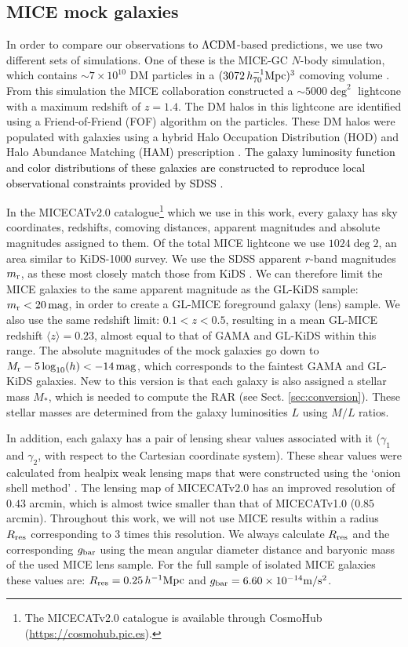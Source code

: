 \documentclass[usenatbib]{mnras}
\newcommand{\hMpc}{\, h^{-1}{\rm{Mpc}} }
\newcommand{\magn}{\, {\rm mag} }
\newcommand{\mpss}{ {\rm m/s^2} }
\newcommand{\hsMpc}{\, h_{70}^{-1}{\rm{Mpc}} }
\newcommand{\lcdm}{{\rm \Lambda CDM}}
\newcommand*{\meanb}[1]{\langle{#1}\rangle}
\newcommand*{\E}[1]{\times 10^{#1}}
\newcommand{\un}[1]{_{\rm #1}}
\begin{document}
\subsection{MICE mock galaxies}
\label{sec:mice_mocks}

In order to compare our observations to $\lcdm$-based predictions, we use two different sets of simulations. One of these is the MICE-GC $N$-body simulation, which contains $\sim 7\E{10}$ DM particles in a $(3072 \hsMpc)^3$ comoving volume \cite[]{fosalba2015b}. From this simulation the MICE collaboration constructed a $\sim5000\deg^2$ lightcone with a maximum redshift of $z=1.4$. The DM halos in this lightcone are identified using a Friend-of-Friend (FOF) algorithm on the particles. These DM halos were populated with galaxies using a hybrid Halo Occupation Distribution (HOD) and Halo Abundance Matching (HAM) prescription \cite[]{carretero2015,crocce2015}. \textcolor{black}{The galaxy luminosity function and color distributions of these galaxies are constructed to reproduce local observational constraints provided by SDSS \cite[]{blanton2003a, blanton2003b, blanton2005}.}

In the MICECATv2.0 catalogue\footnote{The MICECATv2.0 catalogue is available through CosmoHub (\url{https://cosmohub.pic.es}).} which we use in this work, every galaxy has sky coordinates, redshifts, comoving distances, apparent magnitudes and absolute magnitudes assigned to them. Of the total MICE lightcone we use $1024\deg2$, an area similar to KiDS-1000 survey. We use the SDSS apparent $r$-band magnitudes $m\un{r}$, as these most closely match those from KiDS \cite[see][]{brouwer2018}. We can therefore limit the MICE galaxies to the same apparent magnitude as the GL-KiDS sample: $m\un{r}<20 \, {\rm mag}$, in order to create a GL-MICE foreground galaxy (lens) sample. We also use the same redshift limit: $0.1<z<0.5$, resulting in a mean GL-MICE redshift $\meanb{z}=0.23$, almost equal to that of GAMA and GL-KiDS within this range. The absolute magnitudes of the mock galaxies go down to $M\un{r} - 5\log_{10}(h) < -14 \magn$, which corresponds to the faintest GAMA and GL-KiDS galaxies. New to this version is that each galaxy is also assigned a stellar mass $M_*$, which is needed to compute the RAR (see Sect. \ref{sec:conversion}). These stellar masses are determined from the galaxy luminosities $L$ using \cite{bell2001} $M/L$ ratios.

In addition, each galaxy has a pair of lensing shear values associated with it ($\gamma_1$ and $\gamma_2$, with respect to the Cartesian coordinate system). These shear values were calculated from healpix weak lensing maps that were constructed using the `onion shell method' \cite[]{fosalba2008, fosalba2015a}. The lensing map of MICECATv2.0 has an improved resolution of $0.43$ arcmin, which is almost twice smaller than that of MICECATv1.0 ($0.85$ arcmin). Throughout this work, we will not use MICE results within a radius $R\un{res}$ corresponding to 3 times this resolution. We always calculate $R\un{res}$ and the corresponding $g\un{bar}$ using the mean angular diameter distance and baryonic mass of the used MICE lens sample. For the full sample of isolated MICE galaxies these values are: $R\un{res}=0.25 \hMpc$ and $g\un{bar}=6.60\E{-14} \mpss$.
\end{document}
